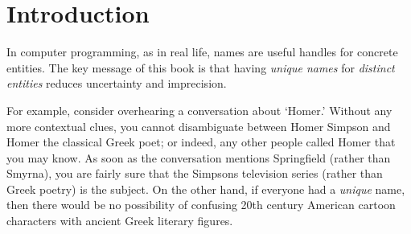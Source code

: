 \chapter{Introduction }
\label{chapter:vanilla}




In computer programming, as in real life, 
names are useful handles for concrete entities.
The key message of this book is that
having \textit{unique names} for
\textit{distinct entities}
reduces uncertainty and imprecision.

For example, consider overhearing a conversation
about `Homer.' Without any more contextual clues, you
cannot disambiguate between Homer Simpson and Homer the
classical Greek poet; or indeed, any other people
called Homer that you may know.
As soon as the conversation mentions Springfield
(rather than Smyrna), you are fairly sure that the
Simpsons television series (rather than Greek poetry)
is the subject.
On the other hand, if everyone had a \textit{unique} name,
then there would be no possibility of confusing 20th century
American cartoon characters with ancient Greek literary figures.



